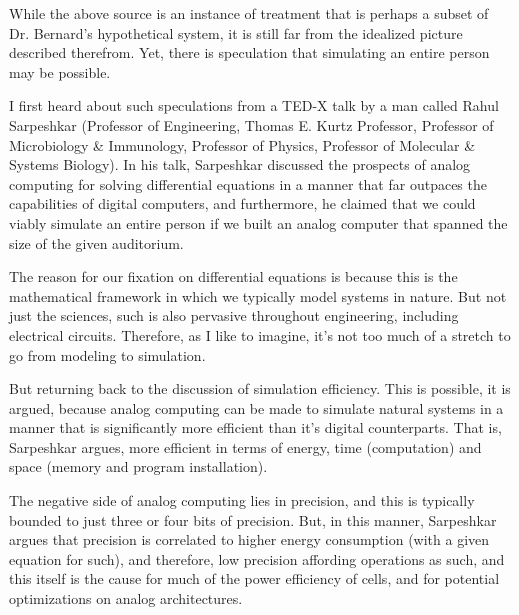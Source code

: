 While the above source is an instance of treatment that is perhaps a subset of Dr. Bernard's hypothetical system, it is still far from the idealized picture described therefrom. Yet, there is speculation that simulating an entire person may be possible.

I first heard about such speculations from a TED-X talk by a man called Rahul Sarpeshkar (Professor of Engineering, Thomas E. Kurtz Professor, Professor of Microbiology \& Immunology, Professor of Physics, Professor of Molecular \& Systems Biology). In his talk, Sarpeshkar discussed the prospects of analog computing for solving differential equations in a manner that far outpaces the capabilities of digital computers, and furthermore, he claimed that we could viably simulate an entire person if we built an analog computer that spanned the size of the given auditorium.

The reason for our fixation on differential equations is because this is the mathematical framework in which we typically model systems in nature. But not just the sciences, such is also pervasive throughout engineering, including electrical circuits. Therefore, as I like to imagine, it's not too much of a stretch to go from modeling to simulation.


But returning back to the discussion of simulation efficiency. This is possible, it is argued, because analog computing can be made to simulate natural systems in a manner that is significantly more efficient than it's digital counterparts. That is, Sarpeshkar argues, more efficient in terms of energy, time (computation) and space (memory and program installation). 

The negative side of analog computing lies in precision, and this is typically bounded to just three or four bits of precision. But, in this manner, Sarpeshkar argues that precision is correlated to higher energy consumption (with a given equation for such), and therefore, low precision affording operations as such, and this itself is the cause for much of the power efficiency of cells, and for potential optimizations on analog architectures. 

